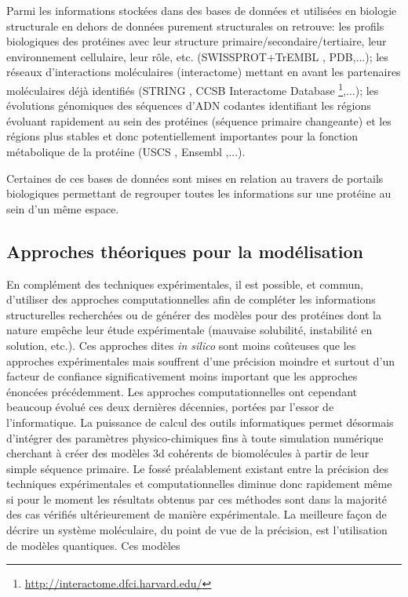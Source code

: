Parmi les informations stockées dans des bases de données et utilisées en biologie structurale en dehors de données purement structurales on retrouve: les profils biologiques des protéines avec leur structure primaire/secondaire/tertiaire, leur environnement cellulaire, leur rôle, etc. (SWISSPROT+TrEMBL \cite{boeckmann2003swiss}, PDB,...); les réseaux d'interactions moléculaires (interactome) mettant en avant les partenaires moléculaires déjà identifiés (STRING \cite{Snel15092000}, CCSB Interactome Database \footnote{\url{http://interactome.dfci.harvard.edu/}},...); les évolutions génomiques des séquences d'ADN codantes identifiant les régions évoluant rapidement au sein des protéines (séquence primaire changeante) et les régions plus stables et donc potentiellement importantes pour la fonction métabolique de la protéine (USCS \cite{kent2002human}, Ensembl \cite{hubbard2002ensembl},...). 

Certaines de ces bases de données sont mises en relation au travers de portails biologiques permettant de regrouper toutes les informations sur une protéine au sein d'un même espace.

\subsection{Approches théoriques pour la modélisation}

En complément des techniques expérimentales, il est possible, et commun, d'utiliser des approches computationnelles afin de compléter les informations structurelles recherchées ou de générer des modèles pour des protéines dont la nature empêche leur étude expérimentale (mauvaise solubilité, instabilité en solution, etc.). Ces approches dites \textit{in silico} sont moins coûteuses que les approches expérimentales mais souffrent d'une précision moindre et surtout d'un facteur de confiance significativement moins important que les approches énoncées précédemment. Les approches computationnelles ont cependant beaucoup évolué ces deux dernières décennies, portées par l'essor de l'informatique. La puissance de calcul des outils informatiques permet désormais d'intégrer des paramètres physico-chimiques fins à toute simulation numérique cherchant à créer des modèles 3d cohérents de biomolécules à partir de leur simple séquence primaire. Le fossé préalablement existant entre la précision des techniques expérimentales et computationnelles diminue donc rapidement même si pour le moment les résultats obtenus par ces méthodes sont dans la majorité des cas vérifiés ultérieurement de manière expérimentale. La meilleure façon de décrire un système moléculaire, du point de vue de la précision, est l'utilisation de modèles quantiques. Ces modèles 

